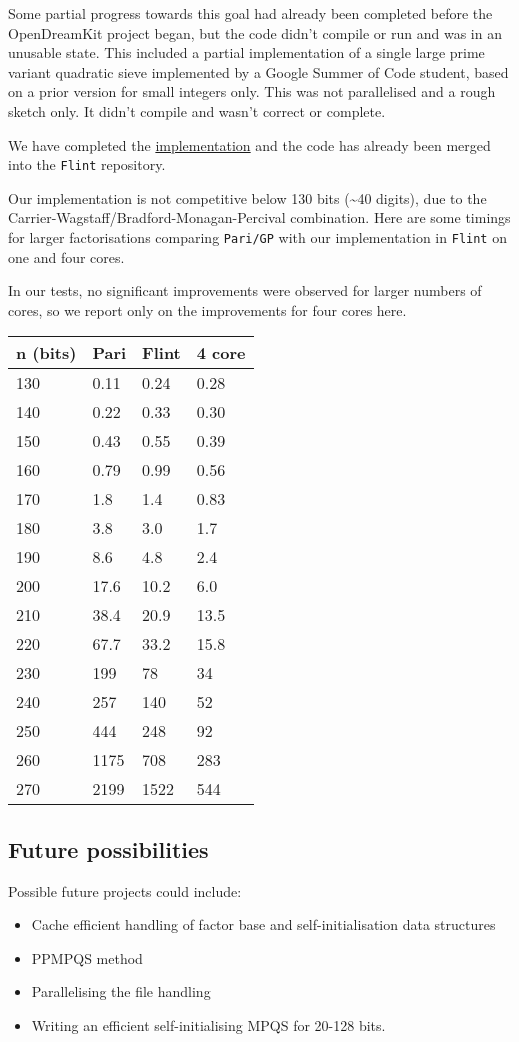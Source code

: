 Some partial progress towards this goal had already been completed
before the OpenDreamKit project began, but the code didn't compile or
run and was in an unusable state. This included a partial implementation
of a single large prime variant quadratic sieve implemented by a Google
Summer of Code student, based on a prior version for small integers
only. This was not parallelised and a rough sketch only. It didn't
compile and wasn't correct or complete.

We have completed the
\href{https://github.com/wbhart/flint2/tree/trunk/qsieve}{implementation}
and the code has already been merged into the \texttt{Flint} repository.

Our implementation is not competitive below 130 bits
(\textasciitilde{}40 digits), due to the
Carrier-Wagstaff/Bradford-Monagan-Percival combination. Here are some
timings for larger factorisations comparing \texttt{Pari/GP} with our
implementation in \texttt{Flint} on one and four cores.

In our tests, no significant improvements were observed for larger
numbers of cores, so we report only on the improvements for four cores
here.

\begin{longtable}[c]{@{}llll@{}}
\toprule
n (bits) & Pari & Flint & 4 core\tabularnewline
\midrule
\endhead
130 & 0.11 & 0.24 & 0.28\tabularnewline
140 & 0.22 & 0.33 & 0.30\tabularnewline
150 & 0.43 & 0.55 & 0.39\tabularnewline
160 & 0.79 & 0.99 & 0.56\tabularnewline
170 & 1.8 & 1.4 & 0.83\tabularnewline
180 & 3.8 & 3.0 & 1.7\tabularnewline
190 & 8.6 & 4.8 & 2.4\tabularnewline
200 & 17.6 & 10.2 & 6.0\tabularnewline
210 & 38.4 & 20.9 & 13.5\tabularnewline
220 & 67.7 & 33.2 & 15.8\tabularnewline
230 & 199 & 78 & 34\tabularnewline
240 & 257 & 140 & 52\tabularnewline
250 & 444 & 248 & 92\tabularnewline
260 & 1175 & 708 & 283\tabularnewline
270 & 2199 & 1522 & 544\tabularnewline
\bottomrule
\end{longtable}

\subsection{Future possibilities}\label{future-possibilities}

Possible future projects could include:

\begin{itemize}
\tightlist
\item
  Cache efficient handling of factor base and self-initialisation data
  structures
\item
  PPMPQS method
\item
  Parallelising the file handling
\item
  Writing an efficient self-initialising MPQS for 20-128 bits.
\end{itemize}

